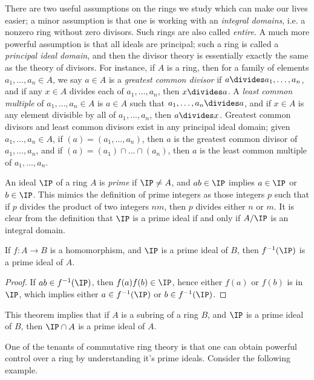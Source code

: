 There are two useful assumptions on the rings we study which can make our lives easier; a minor assumption is that one is working with an \emph{integral domains}, i.e. a nonzero ring without zero divisors. Such rings are also called \emph{entire}. A much more powerful assumption is that all ideals are principal; such a ring is called a \emph{principal ideal domain}, and then the divisor theory is essentially exactly the same as the theory of divisors. For instance, if $A$ is a ring, then for a family of elements $a_1, \dots, a_n \in A$, we say $a \in A$ is a \emph{greatest common divisor} if $a \divides a_1, \dots, a_n$, and if any $x \in A$ divides each of $a_1, \dots, a_n$, then $x \divides a$. A \emph{least common multiple} of $a_1, \dots, a_n \in A$ is $a \in A$  such that $a_1, \dots, a_n \divides a$, and if $x \in A$ is any element divisible by all of $a_1, \dots, a_n$, then $a \divides x$. Greatest common divisors and least common divisors exist in any principal ideal domain; given $a_1, \dots, a_n \in A$, if $(a) = (a_1, \dots, a_n)$, then $a$ is the greatest common divisor of $a_1, \dots, a_n$, and if $(a) = (a_1) \cap \dots \cap (a_n)$, then $a$ is the least common multiple of $a_1, \dots, a_n$.

An ideal $\IP$ of a ring $A$ is \emph{prime} if $\IP \neq A$, and $ab \in \IP$ implies $a \in \IP$ or $b \in \IP$. This mimics the definition of prime integers as those integers $p$ such that if $p$ divides the product of two integers $nm$, then $p$ divides either $n$ or $m$. It is clear from the definition that $\IP$ is a prime ideal if and only if $A/\IP$ is an integral domain.

\begin{theorem}
    If $f: A \to B$ is a homomorphism, and $\IP$ is a prime ideal of $B$, then $f^{-1}(\IP)$ is a prime ideal of $A$.
\end{theorem}
\begin{proof}
    If $ab \in f^{-1}(\IP)$, then $f(a) f(b) \in \IP$, hence either $f(a)$ or $f(b)$ is in $\IP$, which implies either $a \in f^{-1}(\IP)$ or $b \in f^{-1}(\IP)$.
\end{proof}

\begin{remark}
    This theorem implies that if $A$ is a subring of a ring $B$, and $\IP$ is a prime ideal of $B$, then $\IP \cap A$ is a prime ideal of $A$.
\end{remark}

One of the tenants of commutative ring theory is that one can obtain powerful control over a ring by understanding it's prime ideals. Consider the following example.

